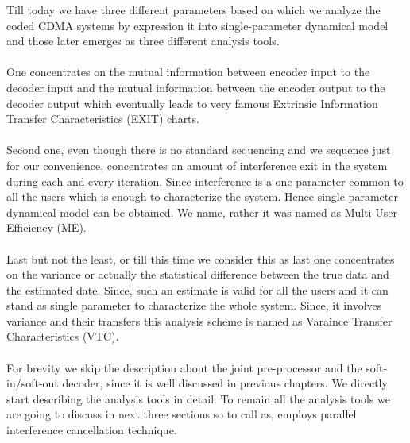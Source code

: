 Till today we have three different parameters based on which we analyze the coded CDMA systems by expression it into single-parameter dynamical model and those later emerges as three different analysis tools.\\ \\
One concentrates on the mutual information between encoder input to the decoder input and the mutual information between the encoder output to the decoder output which eventually leads to very famous Extrinsic Information Transfer Characteristics (EXIT) charts. \\ \\
Second one, even though there is no standard sequencing and we sequence just for our convenience, concentrates on amount of interference exit in the system during each and every iteration. Since interference is a one parameter common to all the users which is enough to characterize the system. Hence single parameter dynamical model can be obtained. We name, rather it was named as Multi-User Efficiency (ME). \\ \\
Last but not the least, or till this time we consider this as last one concentrates on the variance or actually the statistical difference between the true data and the estimated date. Since, such an estimate is valid for all the users and it can stand as single parameter to characterize the whole system. Since, it involves variance and their transfers this analysis scheme is named as Varaince Transfer Characteristics (VTC). \\ \\
For brevity we skip the description about the joint pre-processor and the soft-in/soft-out decoder, since it is well discussed in previous chapters. We directly start describing the analysis tools in detail. To remain all the analysis tools we are going to discuss in next three sections so to call as, employs parallel interference cancellation technique.
